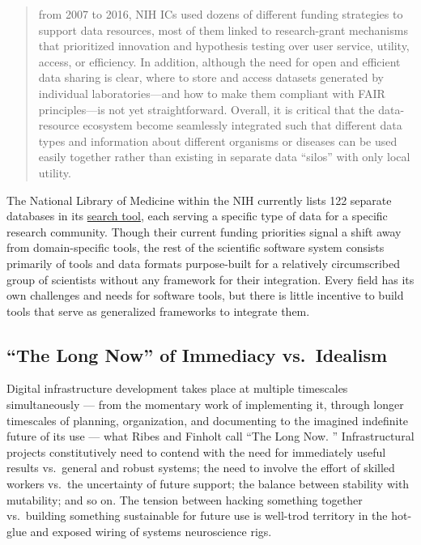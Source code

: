 \documentclass[notoc]{tufte-book}
\begin{document}
\begin{quote}
from 2007 to 2016, NIH ICs used dozens of different funding strategies
to support data resources, most of them linked to research-grant
mechanisms that prioritized innovation and hypothesis testing over user
service, utility, access, or efficiency. In addition, although the need
for open and efficient data sharing is clear, where to store and access
datasets generated by individual laboratories---and how to make them
compliant with FAIR principles---is not yet straightforward. Overall, it
is critical that the data-resource ecosystem become seamlessly
integrated such that different data types and information about
different organisms or diseases can be used easily together rather than
existing in separate data ``silos'' with only local utility.
\end{quote}

The National Library of Medicine within the NIH currently lists 122
separate databases in its
\href{https://eresources.nlm.nih.gov/nlm_eresources/}{search tool}, each
serving a specific type of data for a specific research community.
Though their current funding priorities signal a shift away from
domain-specific tools, the rest of the scientific software system
consists primarily of tools and data formats purpose-built for a
relatively circumscribed group of scientists without any framework for
their integration. Every field has its own challenges and needs for
software tools, but there is little incentive to build tools that serve
as generalized frameworks to integrate them.


\subsection{``The Long Now'' of Immediacy
vs.~Idealism}

Digital infrastructure development takes place at multiple timescales
simultaneously --- from the momentary work of implementing it, through
longer timescales of planning, organization, and documenting to the
imagined indefinite future of its use --- what Ribes and Finholt call
``The Long Now. \citep{ribesLongNowTechnology2009} ''
Infrastructural projects constitutively need to contend with the need
for immediately useful results vs.~general and robust systems; the need
to involve the effort of skilled workers vs.~the uncertainty of future
support; the balance between stability with mutability; and so on. The
tension between hacking something together vs.~building something
sustainable for future use is well-trod territory in the hot-glue and
exposed wiring of systems neuroscience rigs.
\end{document}

